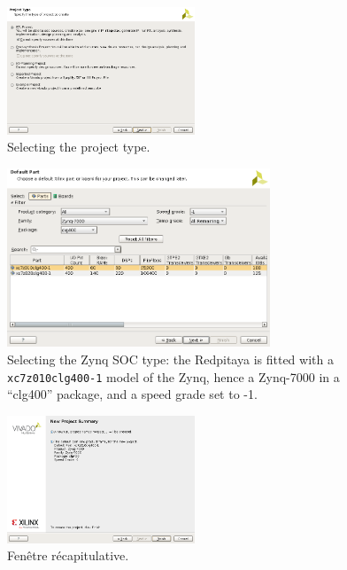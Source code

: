 \documentclass[10pt,oneside]{article}
\begin{document}
\begin{figure}[h!tb]
\begin{center}
\includegraphics[width=0.5\textwidth]{./createProj_selectType.png}
\end{center}
\caption{Selecting the project type.}
\label{createProj_selectType}
\end{figure}
\begin{figure}[h!tb]
\begin{center}
\includegraphics[width=0.7\textwidth]{./createProj_selectPart.png}
\end{center}
\caption{Selecting the Zynq SOC type: the Redpitaya is fitted with a {\tt xc7z010clg400-1} model
of the Zynq, hence a Zynq-7000 in a ``clg400'' package, and a speed grade set to -1.}
\label{createProj_selectpart}
\end{figure}
\begin{figure}[h!tb]
\begin{center}
\includegraphics[width=0.5\textwidth]{./createProj_summary.png}
\end{center}
\caption{Fen\^etre r\'ecapitulative.}
\label{createProj_summary}
\end{figure}
\end{document}
